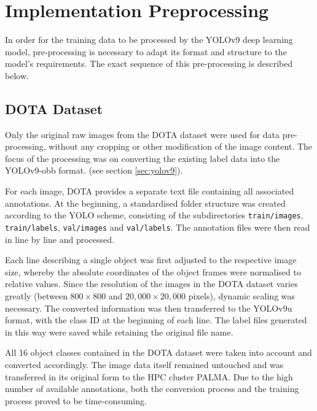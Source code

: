 

\section{Implementation Preprocessing}

In order for the training data to be processed by the YOLOv9 deep learning model, pre-processing is necessary to adapt its format and structure to the model's requirements. The exact sequence of this pre-processing is described below.
\subsection{DOTA Dataset}
Only the original raw images from the \acrshort{DOTA} dataset were used for data pre-processing, without any cropping or other modification of the image content. The focus of the processing was on converting the existing label data into the \acrshort{YOLO}v9-\acrshort{obb} format. (see section \ref{sec:yolov9}).

For each image, \acrshort{DOTA} provides a separate text file containing all associated annotations. At the beginning, a standardised folder structure was created according to the \acrshort{YOLO} scheme, consisting of the subdirectories \texttt{train/images}, \texttt{train/labels}, \texttt{val/images} and \texttt{val/labels}. The annotation files were then read in line by line and processed.

Each line describing a single object was first adjusted to the respective image size, whereby the absolute coordinates of the object frames were normalised to relative values. Since the resolution of the images in the \acrshort{DOTA} dataset varies greatly (between \(800 \times 800\) and \(20,000 \times 20,000\) pixels), dynamic scaling was necessary. The converted information was then transferred to the \acrshort{YOLO}v9u format, with the class ID at the beginning of each line. The label files generated in this way were saved while retaining the original file name.

All 16 object classes contained in the \acrshort{DOTA} dataset were taken into account and converted accordingly. The image data itself remained untouched and was transferred in its original form to the HPC cluster \acrshort{PALMA}. Due to the high number of available annotations, both the conversion process and the training process proved to be time-consuming.


